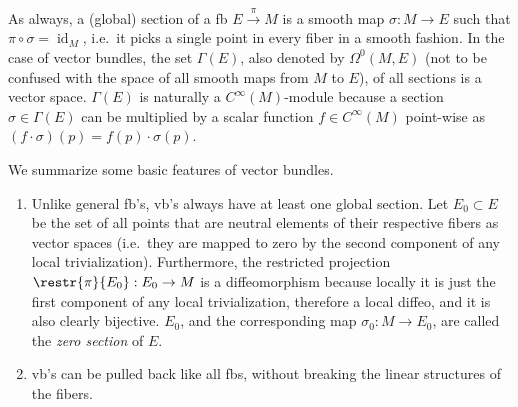 \documentclass[english,letterpaper]{article}%
\numberwithin{equation}{section}
\numberwithin{figure}{section}
\numberwithin{table}{section}
\theoremstyle{definition}
\theoremstyle{definition}
\theoremstyle{definition}
\theoremstyle{plain}
\theoremstyle{plain}
\theoremstyle{plain}
\theoremstyle{plain}
\theoremstyle{remark}
\theoremstyle{remark}
\DeclareMathOperator{\id}{id}
\begin{document}
\begin{defn}
As always, a (global) section of a \gls{fb} $E\overset{\pi}{\to}M$ is a smooth map $\sigma:M\to E$ such that $\pi\circ \sigma=\id_M$, i.e.\ it picks a single point in every fiber in a smooth fashion. In the case of vector bundles, the set $\Gamma(E)$, also denoted by $\Omega^0(M,E)$ (not to be confused with the space of all smooth maps from $M$ to $E$), of all sections is a vector space. $\Gamma(E)$ is naturally a $C^\infty(M)$-module because a section $\sigma\in\Gamma(E)$ can be multiplied by a scalar function $f\in C^\infty(M)$ point-wise as $(f\cdot\sigma)(p)=f(p)\cdot\sigma(p)$.
\end{defn}

We summarize some basic features of vector bundles.
\begin{enumerate}
    \item Unlike general \gls{fb}'s, \gls{vb}'s always have at least one global section. Let $E_0\subset E$ be the set of all points that are neutral elements of their respective fibers as vector spaces (i.e.\ they are mapped to zero by the second component of any local trivialization). Furthermore, the restricted projection $\restr{\pi}{E_0}:E_0\to M$ is a diffeomorphism because locally it is just the first component of any local trivialization, therefore a local diffeo, and it is also clearly bijective. $E_0$, and the corresponding map $\sigma_0:M\to E_0$, are called the \emph{zero section} of $E$.
    \item \gls{vb}'s can be pulled back like all \glspl{fb}, without breaking the linear structures of the fibers.
\end{enumerate}
\end{document}
